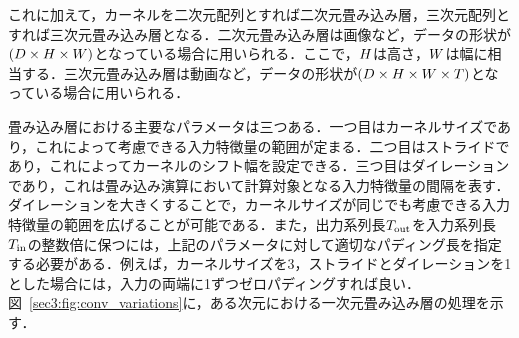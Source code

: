 \documentclass[12pt]{jarticle}
\numberwithin{equation}{section}    %
\numberwithin{figure}{section}      %
\numberwithin{table}{section}      %
\begin{document}
これに加えて，カーネルを二次元配列とすれば二次元畳み込み層，三次元配列とすれば三次元畳み込み層となる．二次元畳み込み層は画像など，データの形状が$\left(D \times H \times W\right)$となっている場合に用いられる．ここで，$H$は高さ，$W$は幅に相当する．三次元畳み込み層は動画など，データの形状が$\left(D \times H \times W \times T\right)$となっている場合に用いられる．

畳み込み層における主要なパラメータは三つある．一つ目はカーネルサイズであり，これによって考慮できる入力特徴量の範囲が定まる．二つ目はストライドであり，これによってカーネルのシフト幅を設定できる．三つ目はダイレーションであり，これは畳み込み演算において計算対象となる入力特徴量の間隔を表す．ダイレーションを大きくすることで，カーネルサイズが同じでも考慮できる入力特徴量の範囲を広げることが可能である．また，出力系列長$T_{\text{out}}$を入力系列長$T_{\text{in}}$の整数倍に保つには，上記のパラメータに対して適切なパディング長を指定する必要がある．例えば，カーネルサイズを3，ストライドとダイレーションを1とした場合には，入力の両端に1ずつゼロパディングすれば良い．図~\ref{sec3:fig:conv_variations}に，ある次元における一次元畳み込み層の処理を示す．
\end{document}
